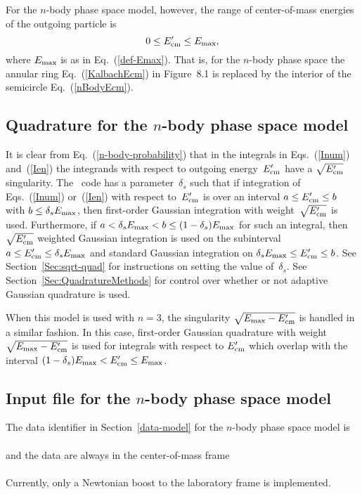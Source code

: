 For the $n$-body phase space model, however, the range of
center-of-mass energies of the outgoing particle is
\begin{equation}
  0 \le E_{\text{cm}}' \le E_{\text{max}},
  \label{nBodyEcm}
\end{equation}
where $E_{\text{max}}$ is as in Eq.~(\ref{def-Emax}).  
That is, for the $n$-body phase space
the annular ring Eq.~(\ref{KalbachEcm}) in Figure~8.1 is replaced by the
interior of the semicircle Eq.~(\ref{nBodyEcm}).

\subsection{Quadrature for the $n$-body phase space model}
\label{Sec:n-body-quadrature}
It is clear from Eq.~(\ref{n-body-probability})
that in the integrals in Eqs.~(\ref{Inum}) and~(\ref{Ien}) the
integrands with respect to outgoing energy~$E_{\text{cm}}'$ have a
$\sqrt{E_{\text{cm}}'}$ singularity.  The \gettransfer\ code has a parameter~$\delta_s$
such that if integration of Eqs.~(\ref{Inum}) or~(\ref{Ien}) with respect
to~$E_{\text{cm}}'$ is over an interval $a \le E_{\text{cm}}' \le b$ with $b \le \delta_s  E_{\text{max}}$,
then first-order Gaussian integration with weight~$\sqrt{E_{\text{cm}}' }$ is used.
Furthermore, if $a < \delta_s  E_{\text{max}} < b \le (1 - \delta_s ) E_{\text{max}}$ for such an integral, then
$\sqrt{E_{\text{cm}}' }$ weighted Gaussian integration is used on
the subinterval $a \le E_{\text{cm}}'  \le \delta_s  E_{\text{max}}$ and standard
Gaussian integration on $\delta_s  E_{\text{max}} \le E_{\text{cm}}'  \le b$.
See Section~\ref{Sec:sqrt-quad} for instructions on setting the
value of~$\delta_s$.  See Section~\ref{Sec:QuadratureMethods}
for control over whether or not adaptive Gaussian quadrature is used.

When this model is used with $n = 3$, the singularity 
$\sqrt{E_{\text{max}} - E_{\text{cm}}'}$ is handled in a similar fashion.  In this case,
first-order Gaussian quadrature with weight $\sqrt{E_{\text{max}} - E_{\text{cm}}'}$
is used for integrals with respect to $E_{\text{cm}}'$ which overlap with
the interval $(1 - \delta_s ) E_{\text{max}} < E_{\text{cm}}' \le E_{\text{max}}$.

\subsection{Input file for the $n$-body phase space model}
The data identifier in Section~\ref{data-model} for the
$n$-body phase space model is\\
  \\
and the data are always in the center-of-mass frame\\
  \\
Currently, only a Newtonian boost to the laboratory frame is
implemented.

